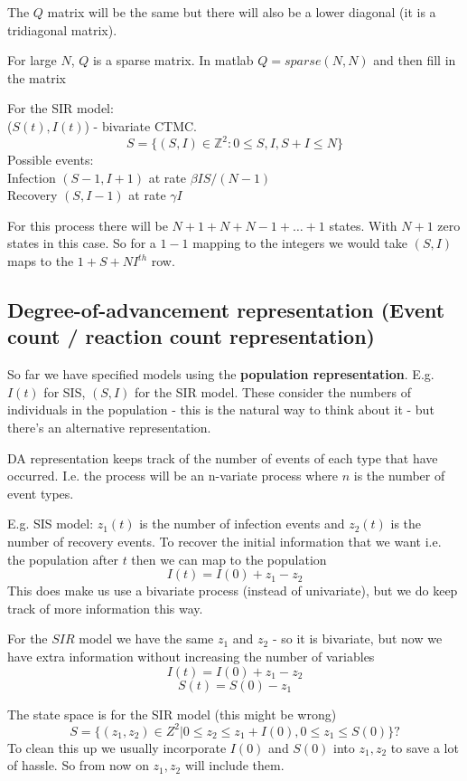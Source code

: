 \documentclass{X:/Documents/Coding/Latex/myassignment}
\begin{document}
The $Q$ matrix will be the same but there will also be a lower diagonal (it is a tridiagonal matrix).

For large $N$, $Q$ is a sparse matrix. In matlab $Q = sparse(N,N)$ and then fill in the matrix 



For the SIR model:\\
($S(t),I(t)$) - bivariate CTMC.
\[S = \{(S,I) \in \mathbb{Z}^2 : 0 \leq S,I,S+I\leq N\}\]
Possible events:\\
Infection $(S-1,I+1)$ at rate $\beta IS/(N-1)$\\
Recovery $(S,I-1)$ at rate $\gamma I$

For this process there will be $N+1 +N + N-1 + \hdots + 1$ states. With $N+1$ zero states in this case.
So for a $1-1$ mapping to the integers we would take $(S,I)$ maps to the $1 +S + NI^{th}$ row.


\subsection{Degree-of-advancement representation (Event count / reaction count representation)}
So far we have specified models using the \textbf{population representation}. E.g. $I(t)$ for SIS, $(S,I)$ for the SIR model. These consider the numbers of individuals in the population - this is the natural way to think about it - but there's an alternative representation.

DA representation keeps track of the number of events of each type that have occurred. I.e. the process will be an n-variate process where $n$ is the number of event types.

E.g. SIS model: $z_1(t)$ is the number of infection events and $z_2(t)$ is the number of recovery events. To recover the initial information that we want i.e. the population after $t$ then we can map to the population
\[I(t) = I(0) + z_1 - z_2\]
This does make us use a bivariate process (instead of univariate), but we do keep track of more information this way.

For the $SIR$ model we have the same $z_1$ and $z_2$ - so it is bivariate, but now we have extra information without increasing the number of variables
\[I(t) = I(0) + z_1 - z_2\]
\[S(t) = S(0) - z_1\]

The state space is for the SIR model (this might be wrong)
\[S = \{(z_1,z_2) \in Z^2 | 0 \leq z_2 \leq z_1 + I(0), 0 \leq z_1 \leq S(0)\}?\]
To clean this up we usually incorporate $I(0)$ and $S(0)$ into $z_1,z_2$ to save a lot of hassle.
So from now on $z_1,z_2$ will include them.
\end{document}
